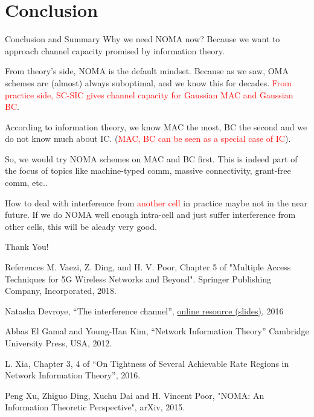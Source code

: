 \documentclass[aspectratio=43, 10pt]{beamer}
\begin{document}
\section{Conclusion}
    \begin{frame}{Conclusion and Summary}
            Why we need NOMA now? Because we want to approach channel capacity promised by information theory.

            \vfill
            From theory's side, NOMA is the default mindset. Because as we saw, OMA schemes are (almost) always suboptimal, and we know this for decades. \textcolor{red}{From practice side, SC-SIC gives channel capacity for Gaussian MAC and Gaussian BC}.
             

            \vfill
            According to information theory, we know MAC the most, BC the second and we do not know much about IC. (\textcolor{red}{MAC, BC can be seen as a special case of IC}). 

            
            \vfill
            So, we would try NOMA schemes on MAC and BC first. This is indeed part of the focus of topics like machine-typed comm, massive connectivity, grant-free comm, etc.. 

            \vfill
            How to deal with interference from \textcolor{red}{another cell} in practice maybe not in the near future. If we do NOMA well enough intra-cell and just suffer interference from other cells, this will be aleady very good. 
    \end{frame}


\begin{frame}
  \begin{center}
  {\fontsize{40}{50}\selectfont Thank You!}
  \end{center}
\end{frame}

\begin{frame}{References}
    \small 
    M. Vaezi, Z. Ding, and H. V. Poor, Chapter 5 of "Multiple Access Techniques for 5G Wireless Networks and Beyond". Springer Publishing Company, Incorporated, 2018.

    \vfill 
    Natasha Devroye, “The interference channel”, \href{http://pfister.ee.duke.edu/nasit16/Devroye_slides.pdf}{online resource (slides)}, 2016

    \vfill 
    Abbas El Gamal and Young-Han Kim, “Network Information Theory” Cambridge University Press, USA, 2012.

    \vfill 
    L. Xia, Chapter 3, 4 of “On Tightness of Several Achievable Rate Regions in Network Information Theory”, 2016. 

    \vfill 
    Peng Xu, Zhiguo Ding, Xuchu Dai and H. Vincent Poor, "NOMA: An Information Theoretic Perspective", arXiv, 2015. 
    
\end{frame}



\end{document}
